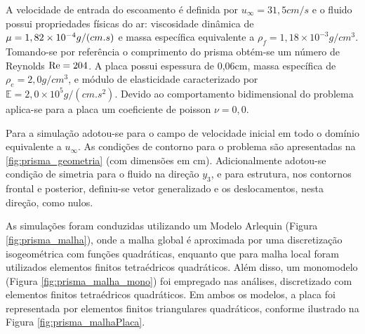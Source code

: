 A velocidade de entrada do escoamento é definida por $u_{\infty} = 31,5 cm/s$ e o fluido possui propriedades físicas do ar: viscosidade dinâmica de $\mu=1,82\times10^{-4} g/(cm.s)$ e massa específica equivalente a $\rho_{f} = 1,18\times10^{-3} g/cm^3 $. Tomando-se por referência o comprimento do prisma obtém-se um número de Reynolds $\mathrm{Re} = 204$. A placa possui espessura de 0,06cm, massa específica de $\rho_{e} =  2,0 g/cm^3 $, e módulo de elasticidade caracterizado por $\mathbb{E} = 2,0\times10^{5} g/(cm.s^2)$. Devido ao comportamento bidimensional do problema aplica-se para a placa um coeficiente de poisson  $\nu=0,0$.

Para a simulação adotou-se para o campo de velocidade inicial em todo o domínio equivalente a $u_{\infty}$. As condições de contorno para o problema são apresentadas na \autoref{fig:prisma_geometria} (com dimensões em cm). Adicionalmente adotou-se condição de simetria para o fluido na direção $y_3$, e para estrutura, nos contornos frontal e posterior, definiu-se vetor generalizado e os deslocamentos, nesta direção, como nulos.

As simulações foram conduzidas utilizando um Modelo Arlequin (Figura \ref{fig:prisma_malha}), onde a malha global é aproximada por uma discretização isogeométrica com funções quadráticas, enquanto que para malha local foram utilizados elementos finitos tetraédricos quadráticos. Além disso, um monomodelo (Figura \ref{fig:prisma_malha_mono}) foi empregado nas análises, discretizado com elementos finitos tetraédricos quadráticos. Em ambos os modelos, a placa foi representada por elementos finitos triangulares quadráticos, conforme ilustrado na Figura \ref{fig:prisma_malhaPlaca}.

